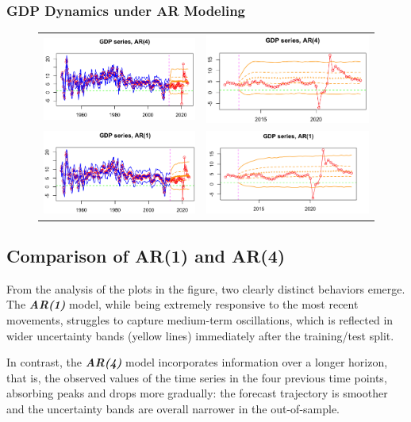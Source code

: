 \documentclass{Configuration_Files/PoliMi3i_thesis}
\begin{document}
\subsubsection{GDP Dynamics under AR Modeling}
\begin{figure}[H]
  \centering
  \begin{tabular}{@{}cc@{}}
    \includegraphics[angle=90,width=0.33\linewidth]{FAR(4)-1.png} &
    \includegraphics[angle=90,width=0.33\linewidth]{ZAR(4)-1.png} \\
    \includegraphics[angle=90,width=0.33\linewidth]{FAR(1)-2.png} &
    \includegraphics[angle=90,width=0.335\linewidth]{ZAR(1)-1.png}
  \end{tabular}
\end{figure}
\restoregeometry

\subsection*{Comparison of AR(1) and AR(4)}
From the analysis of the plots in the figure, two clearly distinct behaviors emerge. The \textbf{\textit{AR(1)}} model, while being extremely responsive to the most recent movements, struggles to capture medium-term oscillations, which is reflected in wider uncertainty bands (yellow lines) immediately after the training/test split.


In contrast, the \textbf{\textit{AR(4)}} model incorporates information over a longer horizon, that is, the observed values of the time series in the four previous time points, absorbing peaks and drops more gradually: the forecast trajectory is smoother and the uncertainty bands are overall narrower in the out-of-sample. 
\end{document}
